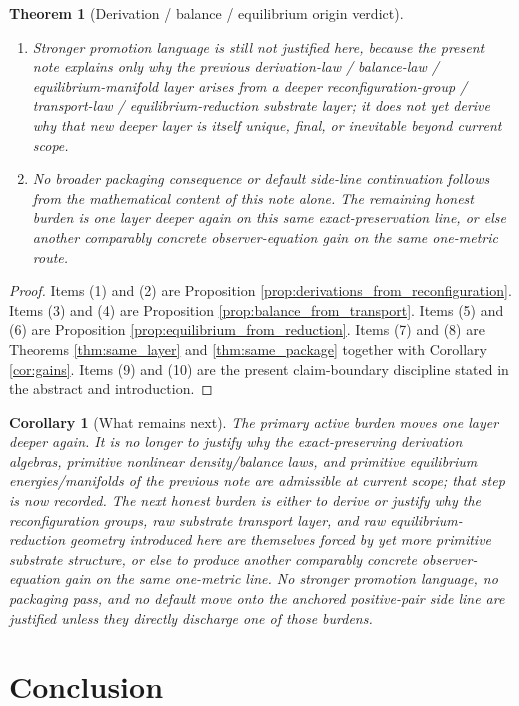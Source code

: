 \documentclass[11pt]{article}
\newtheorem{corollary}{Corollary}
\newtheorem{theorem}{Theorem}
\begin{document}
\begin{theorem}[Derivation / balance / equilibrium origin verdict]
\begin{enumerate}
    \item Stronger promotion language is still not justified here, because the present note explains only why the previous derivation-law / balance-law / equilibrium-manifold layer arises from a deeper reconfiguration-group / transport-law / equilibrium-reduction substrate layer; it does not yet derive why that new deeper layer is itself unique, final, or inevitable beyond current scope.
    \item No broader packaging consequence or default side-line continuation follows from the mathematical content of this note alone. The remaining honest burden is one layer deeper again on this same exact-preservation line, or else another comparably concrete observer-equation gain on the same one-metric route.
\end{enumerate}
\end{theorem}

\begin{proof}
Items (1) and (2) are Proposition \ref{prop:derivations_from_reconfiguration}. Items (3) and (4) are Proposition \ref{prop:balance_from_transport}. Items (5) and (6) are Proposition \ref{prop:equilibrium_from_reduction}. Items (7) and (8) are Theorems \ref{thm:same_layer} and \ref{thm:same_package} together with Corollary \ref{cor:gains}. Items (9) and (10) are the present claim-boundary discipline stated in the abstract and introduction.
\end{proof}

\begin{corollary}[What remains next]
\label{cor:what_next}
The primary active burden moves one layer deeper again. It is no longer to justify why the exact-preserving derivation algebras, primitive nonlinear density/balance laws, and primitive equilibrium energies/manifolds of the previous note are admissible at current scope; that step is now recorded. The next honest burden is either to derive or justify why the reconfiguration groups, raw substrate transport layer, and raw equilibrium-reduction geometry introduced here are themselves forced by yet more primitive substrate structure, or else to produce another comparably concrete observer-equation gain on the same one-metric line. No stronger promotion language, no packaging pass, and no default move onto the anchored positive-pair side line are justified unless they directly discharge one of those burdens.
\end{corollary}

\section{Conclusion}
\end{document}
